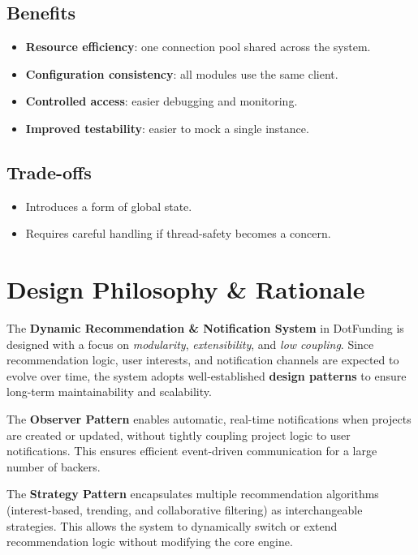 \documentclass[a4paper,12pt]{report}
\begin{document}
\subsection{Benefits}

\begin{itemize}
    \item \textbf{Resource efficiency}: one connection pool shared across the system.
    \item \textbf{Configuration consistency}: all modules use the same client.
    \item \textbf{Controlled access}: easier debugging and monitoring.
    \item \textbf{Improved testability}: easier to mock a single instance.
\end{itemize}

\subsection{Trade-offs}

\begin{itemize}
    \item Introduces a form of global state.
    \item Requires careful handling if thread-safety becomes a concern.
\end{itemize}

\newpage







\section{Design Philosophy \& Rationale}

The \textbf{Dynamic Recommendation \& Notification System} in DotFunding is designed with a focus on \textit{modularity}, \textit{extensibility}, and \textit{low coupling}. Since recommendation logic, user interests, and notification channels are expected to evolve over time, the system adopts well-established \textbf{design patterns} to ensure long-term maintainability and scalability.

The \textbf{Observer Pattern} enables automatic, real-time notifications when projects are created or updated, without tightly coupling project logic to user notifications. This ensures efficient event-driven communication for a large number of backers.

The \textbf{Strategy Pattern} encapsulates multiple recommendation algorithms (interest-based, trending, and collaborative filtering) as interchangeable strategies. This allows the system to dynamically switch or extend recommendation logic without modifying the core engine.
\end{document}
